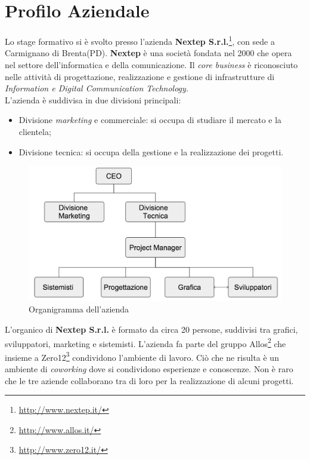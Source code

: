 
\chapter{Profilo Aziendale}
\label{cap:introduzione}

Lo stage formativo si è svolto presso l'azienda \textbf{Nextep S.r.l.}\footnote{\url{http://www.nextep.it/}}, con sede a Carmignano di Brenta(PD). \textbf{Nextep} è una società fondata nel 2000 che opera nel settore dell'informatica e della comunicazione. Il \textit{core business} è riconosciuto nelle attività di progettazione, realizzazione e gestione di infrastrutture di \textit{Information e Digital Communication Technology.}\\
L'azienda è suddivisa in due divisioni principali:
\begin{itemize}
	\item Divisione \textit{marketing} e commerciale: si occupa di studiare il mercato e la clientela;
	\item Divisione tecnica: si occupa della gestione e la realizzazione dei progetti.
\end{itemize}

\begin{figure}[h]
\centering
\includegraphics[width=0.8\linewidth]{immagini/organigramma}
\caption[Organigramma dell'azienda]{Organigramma dell'azienda}
\label{fig:logo-nextep}
\end{figure}

L'organico di \textbf{Nextep S.r.l.} è formato da circa 20 persone, suddivisi tra grafici, sviluppatori, marketing e sistemisti. L'azienda fa parte del gruppo Allos\footnote{\url{http://www.allos.it/}} che insieme a Zero12\footnote{\url{http://www.zero12.it/}} condividono l'ambiente di lavoro. Ciò che ne risulta è un ambiente di \textit{coworking} dove si condividono esperienze e conoscenze. Non è raro che le tre aziende collaborano tra di loro per la realizzazione di alcuni progetti.


